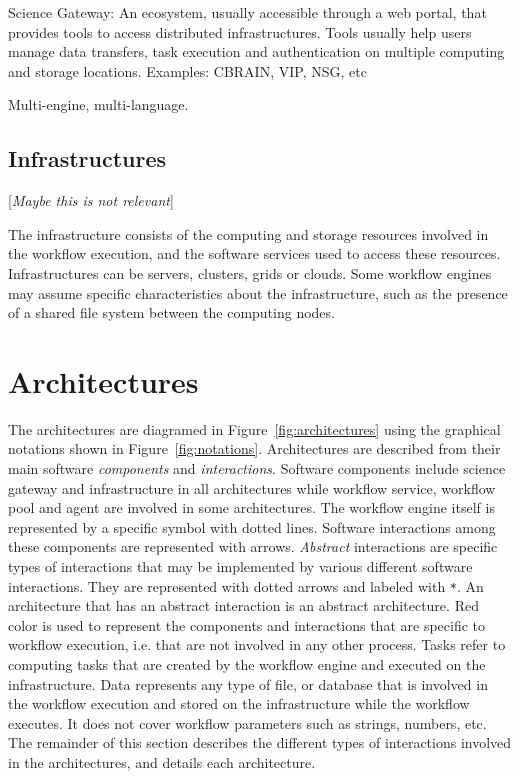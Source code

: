 \documentclass[preprint,3p,twocolumn]{elsarticle}
\newcommand{\todo}[1]{\color{blue}\xspace[\emph{#1}]\xspace\color{black}}
\begin{document}
Science Gateway: An ecosystem, usually accessible through a web
  portal, that provides tools to access distributed
  infrastructures. Tools usually help users manage data transfers,
  task execution and authentication on multiple computing and storage
  locations. Examples: CBRAIN, VIP, NSG, etc

Multi-engine, multi-language.


\subsection{Infrastructures}

\todo{Maybe this is not relevant}

The infrastructure consists of the computing and storage resources
involved in the workflow execution, and the software services used to
access these resources. Infrastructures can be servers, clusters,
grids or clouds. Some workflow engines may assume specific
characteristics about the infrastructure, such as the presence of a
shared file system between the computing nodes.

\section{Architectures}
\label{sec:architectures}

The architectures are diagramed in Figure~\ref{fig:architectures}
using the graphical notations shown in
Figure~\ref{fig:notations}. Architectures are described from their
main software \emph{components} and \emph{interactions}. Software
components include science gateway and infrastructure in all
architectures while workflow service, workflow pool and agent are
involved in some architectures. The workflow engine itself is
represented by a specific symbol with dotted lines. Software
interactions among these components are represented with
arrows. \emph{Abstract} interactions are specific types of
interactions that may be implemented by various different software
interactions. They are represented with dotted arrows and labeled with
 \texttt{*}. An architecture that has an abstract interaction is an
abstract architecture. Red color is used to represent the components
and interactions that are specific to workflow execution, i.e. that
are not involved in any other process. Tasks refer to computing tasks
that are created by the workflow engine and executed on the
infrastructure. Data represents any type of file, or database that is
involved in the workflow execution and stored on the infrastructure
while the workflow executes. It does not cover workflow parameters
such as strings, numbers, etc. The remainder of this section describes
the different types of interactions involved in the architectures, and
details each architecture.
\end{document}
